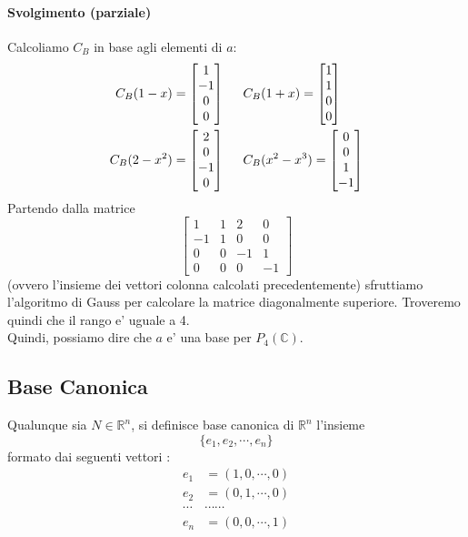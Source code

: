 \documentclass[a4paper, 10pt]{article}
\begin{document}
	  \paragraph*{Svolgimento (parziale)}
	  Calcoliamo $C_B$ in base agli elementi di $a$:
	  \begin{equation*}
	  	\begin{split}
	  		C_B(1-x) &=  \begin{bmatrix} 1 \\ -1 \\ 0 \\ 0 \end{bmatrix} \hspace{0.5cm}
	  		C_B(1+x) =  \begin{bmatrix} 1 \\ 1 \\ 0 \\ 0 \end{bmatrix} \\
	  		C_B(2-x^2) &=  \begin{bmatrix} 2 \\ 0 \\ -1 \\ 0 \end{bmatrix} \hspace{0.5cm}
	  		C_B(x^2-x^3) =  \begin{bmatrix} 0 \\ 0 \\ 1 \\ -1 \end{bmatrix} 
	  	\end{split}
	  \end{equation*}
	  Partendo dalla matrice 
	  \[ \begin{bmatrix}  1 & 1 & 2 & 0 \\ -1 & 1 & 0 & 0 \\ 0 & 0 & -1 & 1 \\ 0 & 0 & 0 & -1 \end{bmatrix} \]
	  (ovvero l'insieme dei vettori colonna calcolati precedentemente) sfruttiamo l'algoritmo di Gauss per
	  calcolare la matrice diagonalmente superiore. Troveremo quindi che il rango e' uguale a 4.\\ Quindi, 
	  possiamo dire che $a$ e' una base per $P_4(\mathbb{C})$.
	  
	 
	\subsection{Base Canonica}
	Qualunque sia $N \in \mathbb{R}^n$, si definisce base canonica di $\mathbb{R}^n$ l'insieme 
	\[ \lbrace e_1, e_2, \cdots, e_n \rbrace \] formato dai seguenti vettori : 
	\begin{equation*} 
		\begin{split} e_1 &= (1, 0 , \cdots, 0) \\ e_2 &= (0,1,\cdots,0) \\ \cdots &\cdots \cdots \\ 
					  e_n &= (0,0,\cdots, 1)
		\end{split}
	\end{equation*}
						
\end{document}
